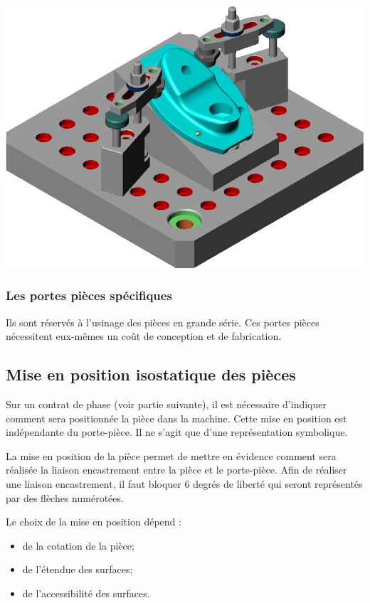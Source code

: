 \documentclass[11pt,oneside]{article}
\begin{document}
\begin{minipage}[c]{.3\linewidth}
\begin{center}
\includegraphics[width=.95\textwidth]{png/modulaire_3}
\end{center}
\end{minipage}


\subsubsection{Les portes pièces spécifiques}

Ils sont réservés à l'usinage des pièces en grande série. Ces portes pièces nécessitent eux-mêmes un coût de conception et de fabrication.



\subsection{Mise en position isostatique des pièces}
Sur un contrat de phase (voir partie suivante), il est nécessaire d'indiquer comment sera positionnée la pièce dans la machine. Cette mise en position est indépendante du porte-pièce. Il ne s'agit que d'une représentation symbolique.

La mise en position de la pièce permet de mettre en évidence comment sera réalisée la liaison encastrement entre la pièce et le porte-pièce. Afin de réaliser une liaison encastrement, il faut bloquer 6 degrés de liberté qui seront représentés par des flèches numérotées. 

Le choix de la mise en position dépend :
\begin{itemize}
\item de la cotation de la pièce;
\item de l'étendue des surfaces;
\item de l'accessibilité des surfaces.
\end{itemize}
\end{document}
